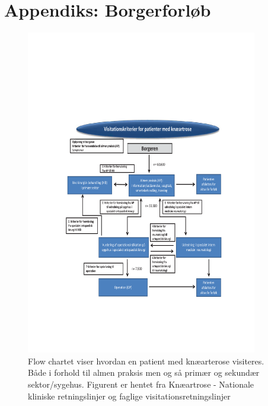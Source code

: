 \chapter{Appendiks: Borgerforløb}\vspace{-.75cm} \label{Borgerforloeb} 
\begin{figure}[H] 
	\begin{center}
		\includegraphics[width=0.9\textwidth]{rapportAfsnit/qBilag/Borgerforloeb}
	\end{center}
	\caption{Flow chartet viser hvordan en patient med knæarterose visiteres. Både i forhold til almen praksis men og så primær og sekundær sektor/sygehus. Figurent er hentet fra Knæartrose - Nationale kliniske retningslinjer og faglige visitationsretningslinjer\citep{brostrom2012}}
	\label{} 
\end{figure}